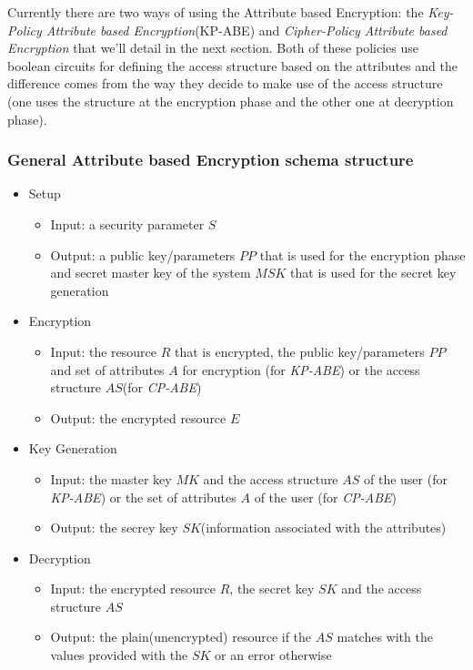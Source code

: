 \documentclass[12pt]{article}
\begin{document}
Currently there are two ways of using the Attribute based Encryption: the \textit{Key-Policy Attribute based Encryption}(KP-ABE) and \textit{Cipher-Policy Attribute based Encryption} that we'll detail in the next section. Both of these policies use boolean circuits for defining the access structure based on the attributes and the difference comes from the way they decide to make use of the access structure (one uses the structure at the encryption phase and the other one at decryption phase).

\subsubsection{General Attribute based Encryption schema structure}

\begin{itemize}
	\item Setup
		\begin{itemize}
			\item Input: a security parameter $S$
			\item Output: a public key/parameters $PP$ that is used for the encryption phase and secret master key of the system $MSK$ that is used for the secret key generation
		\end{itemize}
	\item Encryption
		\begin{itemize}
			\item Input: the resource $R$ that is encrypted, the public key/parameters $PP$ and set of attributes $A$ for encryption (for \textit{KP-ABE}) or the access structure $AS$(for \textit{CP-ABE})
			\item Output: the encrypted resource $E$
		\end{itemize}
	\item Key Generation
		\begin{itemize}
			\item Input: the master key $MK$ and the access structure $AS$ of the user (for \textit{KP-ABE}) or the set of attributes $A$ of the user (for \textit{CP-ABE}) 
			\item Output: the secrey key $SK$(information associated with the attributes)
		\end{itemize}
	\item Decryption
		\begin{itemize}
			\item Input: the encrypted resource $R$, the secret key $SK$ and the access structure $AS$
			\item Output: the plain(unencrypted) resource if the $AS$ matches with the values provided with the $SK$ or an error otherwise
		\end{itemize}
\end{itemize}
\end{document}
